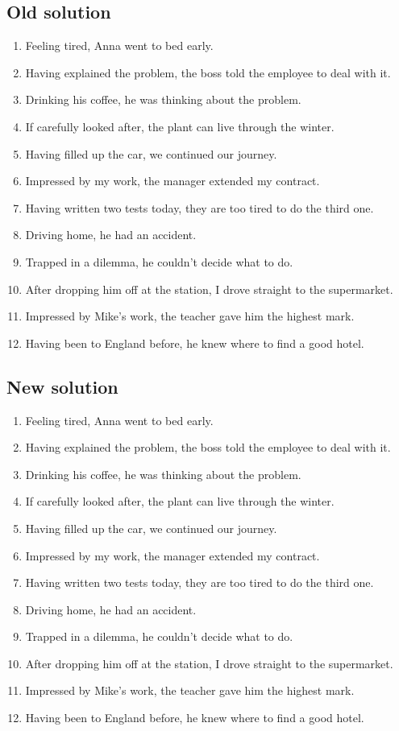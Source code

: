 \subsection*{Old solution}
\begin{enumerate}
      \item Feeling tired, Anna went to bed early.
      \item Having explained the problem, the boss told the employee to deal with it.
      \item Drinking his coffee, he was thinking about the problem.
      \item If carefully looked after, the plant can live through the winter.
      \item Having filled up the car, we continued our journey.
      \item Impressed by my work, the manager extended my contract.
      \item Having written two tests today, they are too tired to do the third one.
      \item Driving home, he had an accident.
      \item Trapped in a dilemma, he couldn’t decide what to do.
      \item After dropping him off at the station, I drove straight to the supermarket.
      \item Impressed by Mike’s work, the teacher gave him the highest mark.
      \item Having been to England before, he knew where to find a good hotel.
\end{enumerate}

\subsection*{New solution}
\begin{enumerate}
      \item Feeling tired, Anna went to bed early.
      \item Having explained the problem, the boss told the employee to deal with it.
      \item Drinking his coffee, he was thinking about the problem.
      \item If carefully looked after, the plant can live through the winter.
      \item Having filled up the car, we continued our journey.
      \item Impressed by my work, the manager extended my contract.
      \item Having written two tests today, they are too tired to do the third one.
      \item Driving home, he had an accident.
      \item Trapped in a dilemma, he couldn’t decide what to do.
      \item After dropping him off at the station, I drove straight to the supermarket.
      \item Impressed by Mike’s work, the teacher gave him the highest mark.
      \item Having been to England before, he knew where to find a good hotel.
\end{enumerate}

